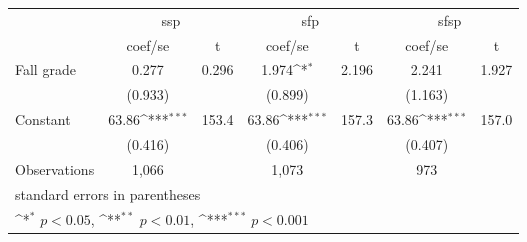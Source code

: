 {
\def\sym#1{\ifmmode^{#1}\else\(^{#1}\)\fi}
\begin{tabular}{l*{3}{cc}}
\hline\hline
                &\multicolumn{2}{c}{ssp}     &\multicolumn{2}{c}{sfp}     &\multicolumn{2}{c}{sfsp}    \\
                &  coef/se         &        t&  coef/se         &        t&  coef/se         &        t\\
\hline
Fall grade      &    0.277         &    0.296&    1.974\sym{*}  &    2.196&    2.241         &    1.927\\
                &  (0.933)         &         &  (0.899)         &         &  (1.163)         &         \\
Constant        &    63.86\sym{***}&    153.4&    63.86\sym{***}&    157.3&    63.86\sym{***}&    157.0\\
                &  (0.416)         &         &  (0.406)         &         &  (0.407)         &         \\
\hline
Observations    &    1,066         &         &    1,073         &         &      973         &         \\
\hline\hline
\multicolumn{7}{l}{\footnotesize standard errors in parentheses}\\
\multicolumn{7}{l}{\footnotesize \sym{*} \(p<0.05\), \sym{**} \(p<0.01\), \sym{***} \(p<0.001\)}\\
\end{tabular}
}
